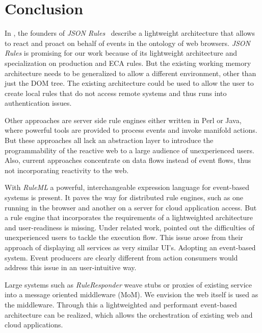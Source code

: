 \documentclass[11pt]{article}%
\begin{document}
\section{Conclusion}
In \cite{2009-Pascalau_Giurca-LWAECARE.pdf}, the founders of \emph{JSON Rules}~\cite{2008-Giurca_Pascalau-JSON_Rules.pdf} describe a lightweight architecture that allows to react and proact on behalf of events in the ontology of web browsers. \emph{JSON Rules} is promising for our work because of its lightweight architecture and specialization on production and ECA rules. But the existing working memory architecture needs to be generalized to allow a different environment, other than just the DOM tree. The existing architecture could be used to allow the user to create local rules that do not access remote systems and thus runs into authentication issues.

Other approaches are server side rule engines either written in Perl or Java, where powerful tools are provided to process events and invoke manifold actions. But these approaches all lack an abstraction layer to introduce the programmability of the reactive web to a large audience of unexperienced users. Also, current approaches concentrate on data flows instead of event flows, thus not incorporating reactivity to the web.

With \emph{RuleML} a powerful, interchangeable expression language for event-based systems is present. It paves the way for distributed rule engines, such as one running in the browser and another on a server for cloud application access. But a rule engine that incorporates the requirements of a lightweighted architecture and user-readiness is missing. Under related work, \cite{2010-Namoun_etal-EURCW.pdf} pointed out the difficulties of unexperienced users to tackle the execution flow. This issue arose from their approach of displaying all services as very similar UI's. Adopting an event-based system. Event producers are clearly different from action consumers would address this issue in an user-intuitive way.

Large systems such as \emph{RuleResponder} weave stubs or proxies of existing service into a message oriented middleware (MoM). We envision the web itself is used as the middleware. Through this a lightweighted and performant event-based architecture can be realized, which allows the orchestration of existing web and cloud applications.
\end{document}
